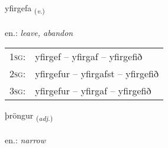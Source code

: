 \documentclass[frontgrid, backgrid]{flacards}\usepackage[]{graphicx}\usepackage[]{xcolor}
\begin{document}
\renewcommand{\flhead}{\vskip5pt \fboxsep=0pt {\small\bfseries\footnotesize Sagnorð | Verb}}
\renewcommand{\fcfoot}{\vskip5pt \fboxsep=0pt \hspace{2pt}{\small\bfseries\footnotesize 2K}}

\renewcommand{\blhead}{\vskip5pt {\small\bfseries\footnotesize Sagnorð | Verb }}
\renewcommand{\bcfoot}{\vskip5pt \hspace{2pt}{\small\bfseries\footnotesize 2K}}


{yfirgefa \small{\textsubscript{(\textit{v.})}} \\[1ex] %
\textphonetic{[ɪːvɪrcɛva]} \\
en.: \emph{leave, abandon} \\  [2ex]
\renewcommand*{\arraystretch}{0.8}
\begin{tabular}{p{1cm}l}
\textsc{1sg}: & yfirgef -- yfirgaf -- yfirgefið \\ 
\textsc{2sg}: & yfirgefur -- yfirgafst -- yfirgefið \\ 
\textsc{3sg}: & yfirgefur -- yfirgaf -- yfirgefið \\ 
\end{tabular}
}

\renewcommand{\flhead}{\vskip5pt \fboxsep=0pt {\small\bfseries\footnotesize Lýsingarorð | Adjective}}
\renewcommand{\fcfoot}{\vskip5pt \fboxsep=0pt \hspace{2pt}{\small\bfseries\footnotesize 2K}}

\renewcommand{\blhead}{\vskip5pt {\small\bfseries\footnotesize Lýsingarorð | Adjective }}
\renewcommand{\bcfoot}{\vskip5pt \hspace{2pt}{\small\bfseries\footnotesize 2K}}


{þröngur \small{\textsubscript{(\textit{adj.})}} \\[1ex] %
\textphonetic{[θrœiŋkʏr]} \\
en.: \emph{narrow} \\  [2ex]
\renewcommand*{\arraystretch}{0.8}
}
\end{document}
